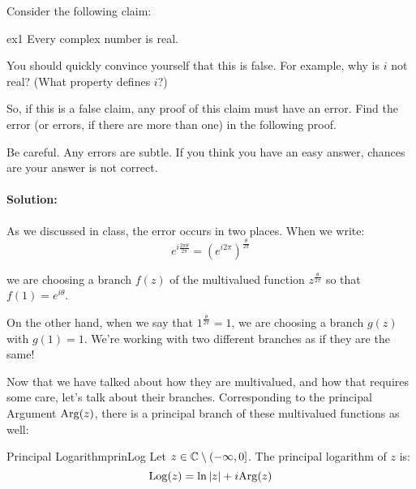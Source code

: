 \begin{ex}{}{}Consider the following claim:

\begin{fthmbo}{}{ex1} Every complex number is real.\end{fthmbo}

You should quickly convince yourself that this is false. For example, why is $i$ not real? (What property defines $i$?)

So, if this is a false claim, any proof of this claim must have an error. Find the error (or errors, if there are more than one) in the following proof.


Be careful. Any errors are subtle. If you think you have an easy answer, chances are your answer is not correct.

\paragraph{Solution:} As we discussed in class, the error occurs in two places. When we write:
$$e^{i\frac{2\pi\theta}{2\pi}} = (e^{i2\pi})^{\frac{\theta}{2\pi}}$$


\noin we are choosing a branch $f(z)$ of the multivalued function $z^{\frac{\theta}{2\pi}}$ so that $f(1) = e^{i\theta}$.

On the other hand, when we say that $1^{\frac{\theta}{2\pi}} = 1$, we are choosing a branch $g(z)$ with $g(1) = 1$. We're working with two different branches as if they are the same!
\end{ex}

Now that we have talked about how they are multivalued, and how that requires some care, let's talk about their branches. Corresponding to the principal Argument $\mathrm{Arg}(z)$, there is a principal branch of these multivalued functions as well:

\begin{defbo}{Principal Logarithm}{prinLog}
Let $z\in \mathbb{C}\setminus(-\infty,0]$. The principal logarithm of $z$ is:
$$\mathrm{Log}(z) = \ln|z| + i\mathrm{Arg}(z)$$
\end{defbo}

